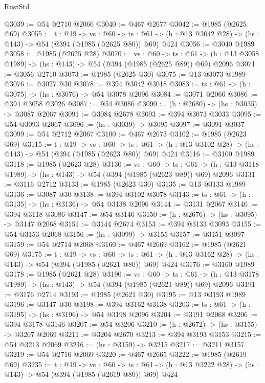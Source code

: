 \begin{lexlean}{RustStd}
\begin{coremodule}
{\begin{coremodule}
{{{{{{{{{{@3039 := @54 @2710 @2066
@3040 := @467 @2677
@3042 := @1985 (@2625 @69)
@3055 := {t : @19} ->
  {vs : @60} ->
  {ts : @61} -> (h : @13 @3042 @28) -> (hs : @143) -> @54 (@394 (@1985 (@2625 @80)) @69) @424
@3056 := @3040 @1989
@3058 := @1985 (@2625 @28)
@3070 := {vs : @60} ->
  {ts : @61} -> (h : @13 @3058 @1989) -> (hs : @143) -> @54 (@394 (@1985 (@2625 @89)) @69) @2096
@3071 := @3056 @2710
@3073 := @1985 (@2625 @30)
@3075 := @13 @3073 @1989
@3076 := @3027 @30
@3078 := @394 @3042 @3018
@3083 := {ts : @61} -> (h : @3075) -> (hs : @3076) -> @54 @3078 @2096
@3084 := @3071 @2066
@3086 := @394 @3058 @3026
@3087 := @54 @3086
@3090 := (h : @2680) -> (hs : @3035) -> @3087 @2067
@3091 := @3084 @2678
@3093 := @394 @3073 @3033
@3095 := @54 @3093 @2067
@3096 := (hs : @3039) -> @3095
@3097 := @3091 @3037
@3099 := @54 @2712 @2067
@3100 := @467 @2673
@3102 := @1985 (@2623 @69)
@3115 := {t : @19} ->
  {vs : @60} ->
  {ts : @61} -> (h : @13 @3102 @28) -> (hs : @143) -> @54 (@394 (@1985 (@2623 @80)) @69) @424
@3116 := @3100 @1989
@3118 := @1985 (@2623 @28)
@3130 := {vs : @60} ->
  {ts : @61} -> (h : @13 @3118 @1989) -> (hs : @143) -> @54 (@394 (@1985 (@2623 @89)) @69) @2096
@3131 := @3116 @2712
@3133 := @1985 (@2623 @30)
@3135 := @13 @3133 @1989
@3136 := @3087 @30
@3138 := @394 @3102 @3078
@3143 := {ts : @61} -> (h : @3135) -> (hs : @3136) -> @54 @3138 @2096
@3144 := @3131 @2067
@3146 := @394 @3118 @3086
@3147 := @54 @3146
@3150 := (h : @2676) -> (hs : @3095) -> @3147 @2068
@3151 := @3144 @2674
@3153 := @394 @3133 @3093
@3155 := @54 @3153 @2068
@3156 := (hs : @3099) -> @3155
@3157 := @3151 @3097
@3159 := @54 @2714 @2068
@3160 := @467 @2669
@3162 := @1985 (@2621 @69)
@3175 := {t : @19} ->
  {vs : @60} ->
  {ts : @61} -> (h : @13 @3162 @28) -> (hs : @143) -> @54 (@394 (@1985 (@2621 @80)) @69) @424
@3176 := @3160 @1989
@3178 := @1985 (@2621 @28)
@3190 := {vs : @60} ->
  {ts : @61} -> (h : @13 @3178 @1989) -> (hs : @143) -> @54 (@394 (@1985 (@2621 @89)) @69) @2096
@3191 := @3176 @2714
@3193 := @1985 (@2621 @30)
@3195 := @13 @3193 @1989
@3196 := @3147 @30
@3198 := @394 @3162 @3138
@3203 := {ts : @61} -> (h : @3195) -> (hs : @3196) -> @54 @3198 @2096
@3204 := @3191 @2068
@3206 := @394 @3178 @3146
@3207 := @54 @3206
@3210 := (h : @2672) -> (hs : @3155) -> @3207 @2069
@3211 := @3204 @2670
@3213 := @394 @3193 @3153
@3215 := @54 @3213 @2069
@3216 := (hs : @3159) -> @3215
@3217 := @3211 @3157
@3219 := @54 @2716 @2069
@3220 := @467 @2665
@3222 := @1985 (@2619 @69)
@3235 := {t : @19} ->
  {vs : @60} ->
  {ts : @61} -> (h : @13 @3222 @28) -> (hs : @143) -> @54 (@394 (@1985 (@2619 @80)) @69) @424
}}}}}}}}}}
\end{coremodule}}
\end{coremodule}
\end{lexlean}
